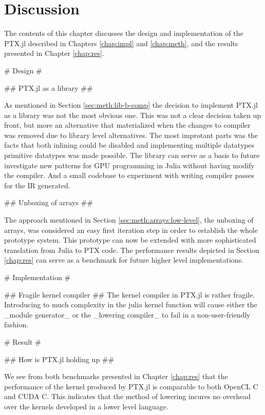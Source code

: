 \chapter{Discussion}
\begin{markdown}

The contents of this chapter discusses the design and implementation
of the PTX.jl described in Chapters \ref{chap:impl} and
\ref{chap:meth}, and the results presented in Chapter \ref{chap:res}.

# Design #

## PTX.jl as a library ##

As mentioned in Section \ref{sec:meth:lib-b-comp} the decision to
implement PTX.jl as a library was not the most obvious one. This was
not a clear decision taken up front, but more an alternative that
materialized when the changes to compiler was removed due to library
level alternatives. The most improtant parts was the facts that both
inlining could be disabled and implementing multiple datatypes
primitive datatypes was made possible. The library can serve as a
basis to future investigate new patterns for GPU programming in Julia
without having modify the compiler. And a small codebase to experiment
with writing compiler passes for the IR generated. 

## Unboxing of arrays ##
 
The approach mentioned in Section \ref{sec:meth:arrays:low-level}, the
unboxing of arrays, was considered an easy first iteration step in
order to establish the whole prototype system. This prototype can now
be extended with more sophisticated translation from Julia to PTX
code. The performance results depicted in Section \ref{chap:res} can
serve as a benchmark for future higher level implementations. 

# Implementation #

## Fragile kernel compiler ##
\label{sec:disc:comp}
The kernel compiler in PTX.jl is rather fragile. Introducing to much
complexity in the julia kernel function will cause either the _module
generator_ or the _lowering compiler_ to fail in a non-user-friendly
fashion.

# Result #

## How is PTX.jl holding up ##

We see from both benchmarks presented in Chapter \ref{chap:res} that
the performance of the kernel produced by PTX.jl is comparable to both
OpenCL C and CUDA C. This indicates that the method of lowering
incures no overhead over the kernels developed in a lower level
language. 


\end{markdown}
